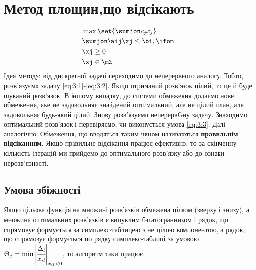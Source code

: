 \section{Метод площин,що відсікають}
\begin{eqnarray}
&\max \set{\sumjon c_jx_j}\label{eq:3:1}\\ 
& \sumjon \aij \xj \leq \bi,\ifom\\
& \xj\geq0\label{eq:3:2}\\
&\xj\in\mZ\label{eq:3:3}
\end{eqnarray}
Ідея методу: від дискретної задачі переходимо до неперервного аналогу. Тобто, розв’язуємо задачу \eqref{eq:3:1}-\eqref{eq:3:2}. Якщо отриманий розв’язок цілий, то це й буде шуканий розв’язок. В іншому випадку, до системи обмеження додаємо нове обмеження, яке не задовольняє знайдений оптимальний, але не цілий план, але задовольняє будь-який цілий. Знову розв’язуємо неперервGну задачу. Знаходимо оптимальний розв’язок і перевіряємо, чи виконується умова \eqref{eq:3:3}. Далі аналогічно. Обмеження, що вводяться таким чином називаються \textbf{правильнім відсіканням}. Якщо правильне відсікання працює ефективно, то за скінченну кількість ітерацій ми прийдемо до оптимального розв’язку або до ознаки нерозв’язності.\\
\subsection{Умова збіжності}
Якщо цільова функція на множині розв’язків обмежена цілком (зверху і знизу), а множина оптимальних розв’язків є випуклим багатогранником і рядок, що спрямовує формується за симплекс-таблицею з не цілою компонентою, а рядок, що спрямовує формується по рядку симплекс-таблиці за умовою $\Theta_j = \min \left| \cfrac{\Delta_l}{x_{il}}\right|_{x_{il}<0}$, то алгоритм таки працює.